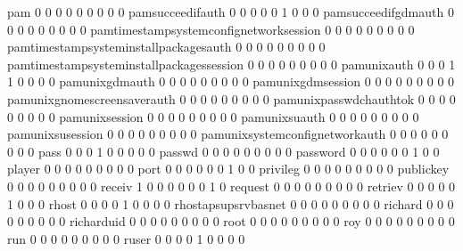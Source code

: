 \documentclass[compress,8pt]{beamer}
\begin{document}
\begin{frame}
\begin{Schunk}
  pam                                        0   0   0   0   0   0   0   0   0
  pamsucceedifauth                           0   0   0   0   0   1   0   0   0
  pamsucceedifgdmauth                        0   0   0   0   0   0   0   0   0
  pamtimestampsystemconfignetworksession     0   0   0   0   0   0   0   0   0
  pamtimestampsysteminstallpackagesauth      0   0   0   0   0   0   0   0   0
  pamtimestampsysteminstallpackagessession   0   0   0   0   0   0   0   0   0
  pamunixauth                                0   0   0   1   1   0   0   0   0
  pamunixgdmauth                             0   0   0   0   0   0   0   0   0
  pamunixgdmsession                          0   0   0   0   0   0   0   0   0
  pamunixgnomescreensaverauth                0   0   0   0   0   0   0   0   0
  pamunixpasswdchauthtok                     0   0   0   0   0   0   0   0   0
  pamunixsession                             0   0   0   0   0   0   0   0   0
  pamunixsuauth                              0   0   0   0   0   0   0   0   0
  pamunixsusession                           0   0   0   0   0   0   0   0   0
  pamunixsystemconfignetworkauth             0   0   0   0   0   0   0   0   0
  pass                                       0   0   0   1   0   0   0   0   0
  passwd                                     0   0   0   0   0   0   0   0   0
  password                                   0   0   0   0   0   0   1   0   0
  player                                     0   0   0   0   0   0   0   0   0
  port                                       0   0   0   0   0   0   1   0   0
  privileg                                   0   0   0   0   0   0   0   0   0
  publickey                                  0   0   0   0   0   0   0   0   0
  receiv                                     1   0   0   0   0   0   0   1   0
  request                                    0   0   0   0   0   0   0   0   0
  retriev                                    0   0   0   0   0   1   0   0   0
  rhost                                      0   0   0   0   1   0   0   0   0
  rhostapsupsrvbasnet                        0   0   0   0   0   0   0   0   0
  richard                                    0   0   0   0   0   0   0   0   0
  richarduid                                 0   0   0   0   0   0   0   0   0
  root                                       0   0   0   0   0   0   0   0   0
  roy                                        0   0   0   0   0   0   0   0   0
  run                                        0   0   0   0   0   0   0   0   0
  ruser                                      0   0   0   0   1   0   0   0   0

\end{Schunk}
\end{frame}
\end{document}
